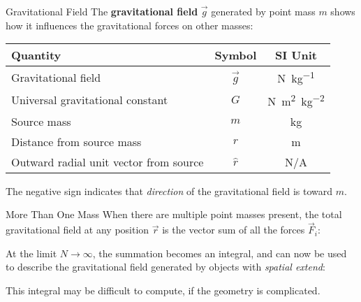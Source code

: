 \documentclass[12pt,compress,aspectratio=169]{beamer}
\begin{document}
\begin{frame}{Gravitational Field}
  The \textbf{gravitational field} $\vec g$ generated by point mass $m$
  shows how it influences the gravitational forces on other masses:

  \begin{center}
    \begin{tabular}{l|c|c}
      \rowcolor{pink}
      \textbf{Quantity} & \textbf{Symbol} & \textbf{SI Unit} \\ \hline
      Gravitational field       & $\vec g$ & \si{\newton\per\kilo\gram}\\
      Universal gravitational constant
      & $G$ & \si{\newton\metre\squared\per\kilo\gram\squared} \\
      Source mass               & $m$ & \si{\kilo\gram} \\
      Distance from source mass & $r$ & \si\metre \\
      Outward radial unit vector from source & $\hat r$ & N/A
    \end{tabular}
  \end{center}
  The negative sign indicates that \emph{direction} of the gravitational field
  is toward $m$.
\end{frame}



\begin{frame}{More Than One Mass}
  When there are multiple point masses present, the total gravitational field
  at any position $\vec r$ is the vector sum of all the forces $\vec F_i$:
    

  At the limit $N\rightarrow\infty$, the summation becomes an integral, and can
  now be used to describe the gravitational field generated by objects with
  \emph{spatial extend}:

  
  This integral may be difficult to compute, if the geometry is complicated.
\end{frame}
\end{document}
